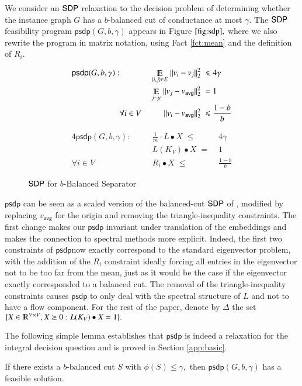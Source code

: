 \documentclass[twoside,leqno,twocolumn]{article}
\renewcommand{\mathbb}{\varmathbb}
\renewcommand{\leq}{\leqslant}
\newcommand{\norm}[1]{\lVert#1\rVert}
\newcommand{\R}{\mathbb R}
\newcommand{\Esymb}{\mathbb{E}}
\DeclareMathOperator*{\E}{\Esymb}
\newcommand{\BS}{{\sc Balanced Separator}\xspace}
\newcommand{\SDP}{{\sf SDP}\xspace}
\numberwithin{equation}{section}
\newcommand{\psdp}{{\ensuremath{{\mathsf{psdp}}}\xspace}}
\newcommand{\avg}{{\ensuremath{\mathsf{avg}}\xspace}}
\begin{document}
We consider an $\SDP$ relaxation to the decision problem of determining whether the instance graph $G$ has a $b$-balanced cut of conductance at most $\gamma.$
The $\SDP$ feasibility program $\psdp(G,b,\gamma)$ appears in Figure $\ref{fig:sdp},$ where we also rewrite the program in matrix notation, using Fact \ref{fct:mean} and the definition of $R_i.$
\begin{figure}[htb]

\begin{minipage}[b]{0.5\linewidth}
\begin{alignat*}{4}
 \psdp(G, b, \gamma): & & \E_{\{i,j\} \in E}\;\norm{v_i-v_j}_2^2 \; \leq& \; 4\gamma   \\
 & & \E_{j \sim \mu}\; \norm{v_j- v_\avg}_2^2 \;=& \;1 \\
    &\forall i\in V \;   &  \norm{v_i- v_\avg}_2^2 \;\leq& \; \frac{1-b}{b}
\end{alignat*}
\end{minipage}
\begin{minipage}[b]{0.5\linewidth}
\begin{alignat*}{4}
 \psdp(G,b,\gamma):  & &  \frac{1}{m} \cdot L \bullet X \; \leq& \; 4\gamma \\
  & &  L(K_V) \bullet X \; =& \; 1 \\
     \forall i\in V & \quad  &  R_i \bullet X \; \leq& \; \frac{1-b}{b}
\end{alignat*}
\end{minipage}
\label{fig:sdp}
\caption{$\SDP$ for $b$-\BS}
\end{figure}
$\psdp$ can be seen as a scaled version of the balanced-cut $\SDP$ of \cite{ARV}, modified by replacing $v_\avg$ for the origin and removing the triangle-inequality constraints. The first change makes our $\psdp$ invariant under translation of the embeddings and makes the connection to spectral methods more explicit. Indeed, the first two constraints of \psdp now exactly correspond to the standard eigenvector problem, with the addition of the $R_i$ constraint ideally forcing all entries in the eigenvector not to be too far from the mean, just as it would be the case if the eigenvector exactly corresponded to a balanced cut. 
The removal of the triangle-inequality constraints causes $\psdp$ to only deal with the spectral structure of $L$ and not to have a flow component.
For the rest of the paper, denote by $\Delta$ the set $\{X \in \R^{V \times V}, X \succeq 0 : L(K_V) \bullet X = 1\}.$

\noindent
The following simple lemma establishes that $\psdp$ is indeed a relaxation for the integral decision question  and is proved in Section \ref{app:basic}. 
\begin{lemma}\label{lem:relax} If there exists a $b$-balanced cut $S$ with $\phi(S) \leq \gamma,$ then $\psdp(G,b,\gamma)$ has a feasible solution.
\end{lemma}
\end{document}
